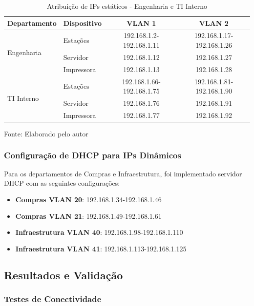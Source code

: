 \begin{table}[H]
\centering
\caption{Atribuição de IPs estáticos - Engenharia e TI Interno}
\begin{tabular}{|l|l|c|c|}
\hline
\textbf{Departamento} & \textbf{Dispositivo} & \textbf{VLAN 1} & \textbf{VLAN 2} \\
\hline
\multirow{3}{*}{Engenharia} & Estações & 192.168.1.2-192.168.1.11 & 192.168.1.17-192.168.1.26 \\
\cline{2-4}
& Servidor & 192.168.1.12 & 192.168.1.27 \\
\cline{2-4}
& Impressora & 192.168.1.13 & 192.168.1.28 \\
\hline
\multirow{3}{*}{TI Interno} & Estações & 192.168.1.66-192.168.1.75 & 192.168.1.81-192.168.1.90 \\
\cline{2-4}
& Servidor & 192.168.1.76 & 192.168.1.91 \\
\cline{2-4}
& Impressora & 192.168.1.77 & 192.168.1.92 \\
\hline
\end{tabular}

\label{tab:ips_estaticos}
{\fontsize{10pt}{\baselineskip}\selectfont
Fonte: Elaborado pelo autor}
\end{table}

\subsubsection{Configuração de DHCP para IPs Dinâmicos}

Para os departamentos de Compras e Infraestrutura, foi implementado servidor DHCP com as seguintes configurações:

\begin{itemize}
    \item \textbf{Compras VLAN 20}: 192.168.1.34-192.168.1.46
    \item \textbf{Compras VLAN 21}: 192.168.1.49-192.168.1.61
    \item \textbf{Infraestrutura VLAN 40}: 192.168.1.98-192.168.1.110
    \item \textbf{Infraestrutura VLAN 41}: 192.168.1.113-192.168.1.125
\end{itemize}

\subsection{Resultados e Validação}

\subsubsection{Testes de Conectividade}

